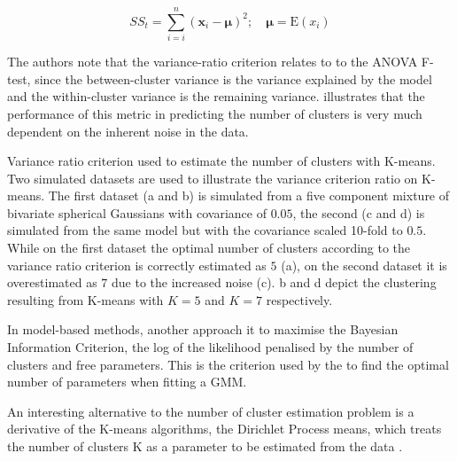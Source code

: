 \[
  SS_{t} = \sum_{i=i}^{n} ( \mathbf x_i - \boldsymbol\mu )^2 ; \quad \boldsymbol\mu=\text{E}(x_i)
\]

The authors note that the variance-ratio criterion relates to
to the \gls{ANOVA} F-test,
since the between-cluster variance is the variance explained by the model
and the within-cluster variance is the remaining variance.
 illustrates that the performance of this metric in predicting the number of clusters
is very much dependent on the inherent noise in the data.



{Variance ratio criterion used to estimate the number of clusters with K-means.}
{
  Two simulated datasets are used to illustrate the variance criterion ratio on K-means.
  The first dataset (a and b) is simulated from a five component mixture of bivariate spherical Gaussians with covariance of $0.05$,
  the second (c and d) is simulated from the same model but with the covariance scaled 10-fold to $0.5$.
  While on the first dataset the optimal number of clusters according to the variance ratio criterion is correctly estimated as $5$ (a),
  on the second dataset it is overestimated as $7$ due to the increased noise (c).
  b and d depict the clustering resulting from K-means with $K=5$ and $K=7$ respectively.
}


In model-based methods, another approach it to maximise the Bayesian Information Criterion, the log of the likelihood penalised by the number of clusters and free parameters.
This is the criterion used by the  to find the optimal number of parameters when fitting a \gls{GMM}.


An interesting alternative to the number of cluster estimation problem is a derivative of the K-means algorithms,
the Dirichlet Process means, which treats the number of clusters
K as a parameter to be estimated from the data \citep{Kulis:2011wj}.

